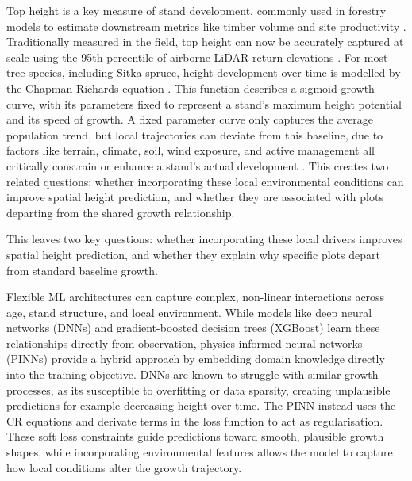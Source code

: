\documentclass[logo,msc,ai]{infthesis}           %
\begin{document}
Top height is a key measure of stand development, commonly used in forestry models to estimate downstream metrics like timber volume and site productivity \cite{ForestResearch2026Sitka_C1_SS}. Traditionally measured in the field, top height can now be accurately captured at scale using the 95th percentile of airborne LiDAR return elevations \cite{suarezminguez2008Practical_C1_SS}. For most tree species, including Sitka spruce, height development over time is modelled by the Chapman-Richards equation \cite{pommerening2015Methods_C2_CR}. This function describes a sigmoid growth curve, with its parameters fixed to represent a stand's maximum height potential and its speed of growth. A fixed parameter curve only captures the average population trend, but local trajectories can deviate from this baseline, due to factors like terrain, climate, soil, wind exposure, and active management all critically constrain or enhance a stand's actual development \cite{socha2023Higher_C1_SS, cameron2015Building_C1_SS}. This creates two related questions: whether incorporating these local environmental conditions can improve spatial height prediction, and whether they are associated with plots departing from the shared growth relationship.

This leaves two key questions: whether incorporating these local drivers improves spatial height prediction, and whether they explain why specific plots depart from standard baseline growth.

Flexible ML architectures can capture complex, non-linear interactions across age, stand structure, and local environment. While models like deep neural networks (DNNs) and gradient-boosted decision trees (XGBoost) learn these relationships directly from observation, physics-informed neural networks (PINNs) provide a hybrid approach by embedding domain knowledge directly into the training objective. DNNs are known to struggle with similar growth processes, as its susceptible to overfitting or data sparsity, creating unplausible predictions for example decreasing height over time. The PINN instead uses the CR equations and derivate terms in the loss function to act as regularisation. These soft loss constraints guide predictions toward smooth, plausible growth shapes, while incorporating environmental features allows the model to capture how local conditions alter the growth trajectory. \cite{karpatne2017Theory_C4_NN, pichler2025Inferring_C4_NN}
\end{document}
